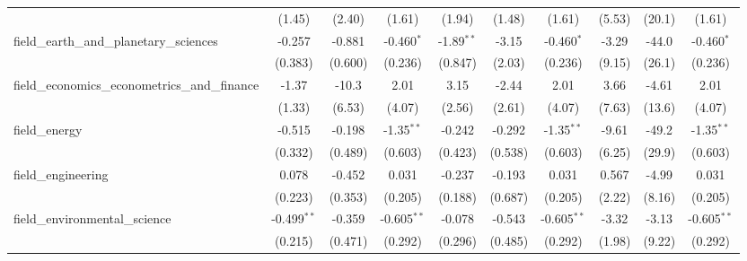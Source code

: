 \begin{tabular}{lccccccccc}
                                                               & (1.45)         & (2.40)         & (1.61)         & (1.94)        & (1.48)         & (1.61)         & (5.53)        & (20.1)       & (1.61)\\   
   field\_earth\_and\_planetary\_sciences                      & -0.257         & -0.881         & -0.460$^{*}$   & -1.89$^{**}$  & -3.15          & -0.460$^{*}$   & -3.29         & -44.0        & -0.460$^{*}$\\   
                                                               & (0.383)        & (0.600)        & (0.236)        & (0.847)       & (2.03)         & (0.236)        & (9.15)        & (26.1)       & (0.236)\\   
   field\_economics\_econometrics\_and\_finance                & -1.37          & -10.3          & 2.01           & 3.15          & -2.44          & 2.01           & 3.66          & -4.61        & 2.01\\   
                                                               & (1.33)         & (6.53)         & (4.07)         & (2.56)        & (2.61)         & (4.07)         & (7.63)        & (13.6)       & (4.07)\\   
   field\_energy                                               & -0.515         & -0.198         & -1.35$^{**}$   & -0.242        & -0.292         & -1.35$^{**}$   & -9.61         & -49.2        & -1.35$^{**}$\\   
                                                               & (0.332)        & (0.489)        & (0.603)        & (0.423)       & (0.538)        & (0.603)        & (6.25)        & (29.9)       & (0.603)\\   
   field\_engineering                                          & 0.078          & -0.452         & 0.031          & -0.237        & -0.193         & 0.031          & 0.567         & -4.99        & 0.031\\   
                                                               & (0.223)        & (0.353)        & (0.205)        & (0.188)       & (0.687)        & (0.205)        & (2.22)        & (8.16)       & (0.205)\\   
   field\_environmental\_science                               & -0.499$^{**}$  & -0.359         & -0.605$^{**}$  & -0.078        & -0.543         & -0.605$^{**}$  & -3.32         & -3.13        & -0.605$^{**}$\\   
                                                               & (0.215)        & (0.471)        & (0.292)        & (0.296)       & (0.485)        & (0.292)        & (1.98)        & (9.22)       & (0.292)\\   

\end{tabular}
